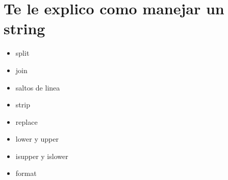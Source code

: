 \section*{Te le explico como manejar un string}

\begin{itemize}
    \item split
    \item join
    \item saltos de linea
    \item strip
    \item replace
    \item lower y upper
    \item isupper y islower
    \item format
\end{itemize}

